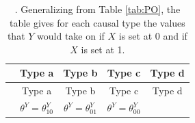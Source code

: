 \documentclass[12pt,]{book}
\begin{document}
\begin{longtable}[]{@{}lcccc@{}}
\caption{\label{tab:POGEN}. Generalizing from Table \ref{tab:PO}, the table gives for each causal type the values that \(Y\) would take on if \(X\) is set at \(0\) and if \(X\) is set at 1.}\tabularnewline
\toprule
\begin{minipage}[b]{0.10\columnwidth}\raggedright
\small\strut
\end{minipage} & \begin{minipage}[b]{0.19\columnwidth}\centering
Type a\strut
\end{minipage} & \begin{minipage}[b]{0.21\columnwidth}\centering
Type b\strut
\end{minipage} & \begin{minipage}[b]{0.18\columnwidth}\centering
Type c\strut
\end{minipage} & \begin{minipage}[b]{0.18\columnwidth}\centering
Type d\strut
\end{minipage}\tabularnewline
\midrule
\endfirsthead
\toprule
\begin{minipage}[b]{0.10\columnwidth}\raggedright
\small\strut
\end{minipage} & \begin{minipage}[b]{0.19\columnwidth}\centering
Type a\strut
\end{minipage} & \begin{minipage}[b]{0.21\columnwidth}\centering
Type b\strut
\end{minipage} & \begin{minipage}[b]{0.18\columnwidth}\centering
Type c\strut
\end{minipage} & \begin{minipage}[b]{0.18\columnwidth}\centering
Type d\strut
\end{minipage}\tabularnewline
\midrule
\endhead
\begin{minipage}[t]{0.10\columnwidth}\raggedright
\strut
\end{minipage} & \begin{minipage}[t]{0.19\columnwidth}\centering
\(\theta^Y=\theta^Y_{10}\)\strut
\end{minipage} & \begin{minipage}[t]{0.21\columnwidth}\centering
\(\theta^Y=\theta^Y_{01}\)\strut
\end{minipage} & \begin{minipage}[t]{0.18\columnwidth}\centering
\(\theta^Y=\theta^Y_{00}\)\strut
\end{minipage} & \begin{minipage}[t]{0.18\columnwidth}\centering

\end{minipage}
\end{longtable}
\end{document}
